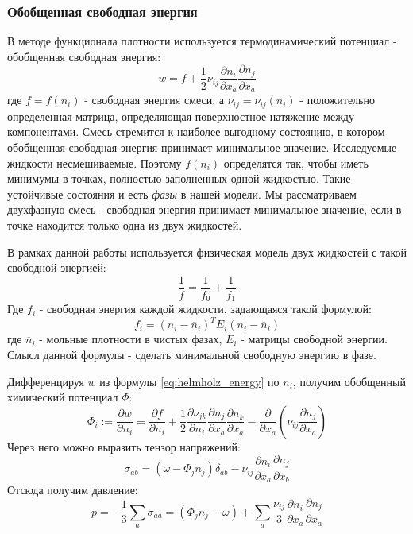 \subsubsection*{Обобщенная свободная энергия}
В методе функционала плотности используется термодинамический потенциал - обобщенная свободная энергия:
\begin{equation} \label{eq:helmholz_energy}
w = f + \frac{1}{2} \nu_{ij} \frac {\partial n_i} {\partial x_a} \frac {\partial n_j} {\partial x_a}
\end{equation}
где $f = f(n_i)$ - свободная энергия смеси, а $\nu_{ij} = \nu_{ij} (n_i)$ - положительно определенная матрица, определяющая поверхностное натяжение между компонентами. Смесь стремится к наиболее выгодному состоянию, в котором обобщенная свободная энергия принимает минимальное значение. Исследуемые жидкости несмешиваемые. Поэтому $f(n_i)$ определятся так, чтобы иметь минимумы в точках, полностью заполненных одной жидкостью. Такие устойчивые состояния и есть \textit{фазы} в нашей модели. Мы рассматриваем двухфазную смесь - свободная энергия принимает минимальное значение, если в точке находится только одна из двух жидкостей.
\par
В рамках данной работы используется физическая модель двух жидкостей с такой свободной энергией:
\begin{equation}
\frac{1}{f} = \frac{1}{f_0} + \frac{1}{f_1}
\end{equation}
Где $f_i$ - свободная энергия каждой жидкости, задающаяся такой формулой:
\begin{equation}
f_i = (n_i - \overline n_i)^T E_i (n_i - \overline n_i)
\end{equation}
где $\overline n_i$ - мольные плотности в чистых фазах, $E_i$ - матрицы свободной энергии. Смысл данной формулы - сделать минимальной свободную энергию в фазе.
\par
Дифференцируя $w$  из формулы \eqref{eq:helmholz_energy} по $n_i$, получим обобщенный химический потенциал $\Phi$:
\begin{equation}
\Phi_i := \frac{\partial w}{\partial n_i} =\frac{\partial f}{\partial n_{i}}+\frac{1}{2}\frac{\partial\nu_{jk}}{\partial n_{i}}\frac{\partial n_{j}}{\partial x_{a}}\frac{\partial n_{k}}{\partial x_{a}}-\frac{\partial}{\partial x_{a}}\left(\nu_{ij}\frac{\partial n_{j}}{\partial x_{a}}\right)
\end{equation}
Через него можно выразить тензор напряжений:
\begin{equation}
\sigma_{ab} = (\omega-\Phi_{j}n_{j})\delta_{ab}-\nu_{ij}\frac{\partial n_{i}}{\partial x_{a}}\frac{\partial n_{j}}{\partial x_{b}}
\end{equation}
Отсюда получим давление:
\begin{equation}
p=-\frac{1}{3}\sum_a{\sigma_{aa}}=(\Phi_{j}n_{j}-\omega)+\sum_a{\frac{\nu_{ij}}{3}\frac{\partial n_{i}}{\partial x_{a}}\frac{\partial n_{j}}{\partial x_{a}}}
\end{equation}
